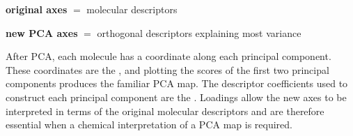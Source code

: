 {{%
  }
  \vspace{2em}
  \textbf{original axes}
  $=$
  molecular descriptors

  \textbf{new PCA axes}
  $=$
  orthogonal descriptors explaining most variance

}

After PCA, each molecule has a coordinate along each principal component.
These coordinates are the , and plotting the scores of the first two principal components produces the familiar PCA map.
The descriptor coefficients used to construct each principal component are the .
Loadings allow the new axes to be interpreted in terms of the original molecular descriptors and are therefore essential when a chemical interpretation of a PCA map is required.

